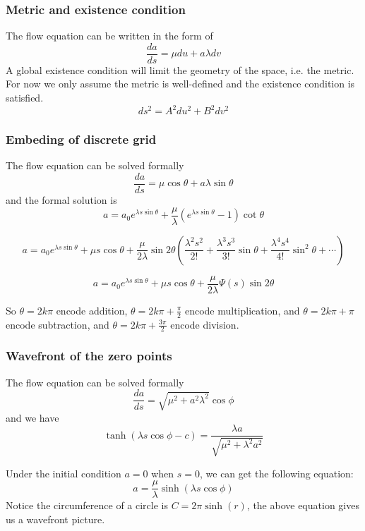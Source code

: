 \documentclass[aspectratio=169]{beamer}
\begin{document}
\begin{frame}
    \frametitle{Metric and existence condition}
    The flow equation can be written in the form of
    \[
        \frac{da}{ds} = \mu du + a \lambda dv
    \]
    A global existence condition will limit the geometry of the space, i.e. the metric.
    For now we only assume the metric is well-defined and the existence condition is satisfied.
    \begin{equation}
        ds^2 = A^2 du^2 + B^2 dv^2\label{eq:metric}
    \end{equation}
\end{frame}

\begin{frame}
    \frametitle{Embeding of discrete grid}
    The flow equation can be solved formally
    \[
        \frac{da}{ds} = \mu \cos \theta + a \lambda \sin \theta
    \]
    and the formal solution is
    \begin{equation}\label{eq:directformalsolution}
    a =  a_0 e^{\lambda s \sin \theta} + \frac{\mu}{\lambda} (e^{\lambda s \sin \theta} - 1) \cot \theta
    \end{equation}

    \[
        a = a_0 e^{\lambda s \sin \theta} + \mu s \cos \theta + \frac{\mu}{2\lambda} \sin 2\theta (\frac{\lambda^2s^2}{2!} + \frac{\lambda^3s^3}{3!} \sin \theta + \frac{\lambda^4s^4}{4!} \sin^2 \theta + \cdots)
    \]

    \[
        a = a_0 e^{\lambda s \sin \theta} + \mu s \cos \theta + \frac{\mu}{2\lambda} \Psi(s) \sin 2\theta
    \]

    So $\theta = 2k\pi$ encode addition, $\theta = 2k\pi + \frac{\pi}{2}$ encode multiplication,
    and $\theta = 2k\pi + \pi$ encode subtraction, and $\theta = 2k\pi + \frac{3\pi}{2}$ encode division.
\end{frame}

\begin{frame}
    \frametitle{Wavefront of the zero points}
    The flow equation can be solved formally
    \[
        \frac{da}{ds} = \sqrt {\mu^2 + a^2 \lambda^2} \cos \phi
    \]
    and we have
    \[
    \tanh(\lambda s \cos \phi - c) = \frac{\lambda a}{\sqrt{\mu^2 + \lambda^2 a^2}}
    \]

    Under the initial condition $a = 0$ when $s = 0$, we can get the following equation:
    \begin{equation}
        a = \frac{\mu}{\lambda} \sinh(\lambda s \cos \phi)\label{eq:gradevo2}
    \end{equation}
    Notice the circumference of a circle is $C = 2 \pi \sinh(r)$, the above equation gives us a wavefront picture.
\end{frame}
\end{document}
